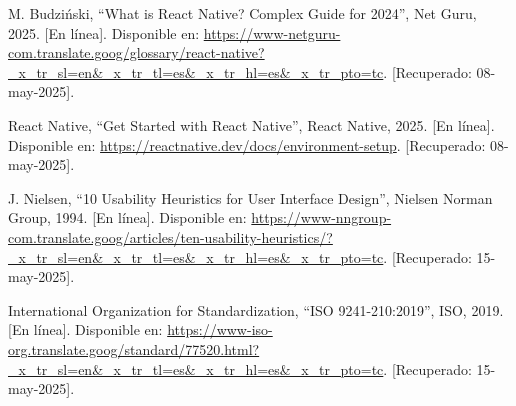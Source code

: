 \begin{thebibliography}{200}
    M. Budziński, “What is React Native? Complex Guide for 2024”, Net Guru, 2025. [En línea]. Disponible en: \url{https://www-netguru-com.translate.goog/glossary/react-native?_x_tr_sl=en&_x_tr_tl=es&_x_tr_hl=es&_x_tr_pto=tc}. [Recuperado: 08-may-2025].

    React Native, “Get Started with React Native”, React Native, 2025. [En línea]. Disponible en: \url{https://reactnative.dev/docs/environment-setup}. [Recuperado: 08-may-2025].

    J. Nielsen, “10 Usability Heuristics for User Interface Design”, Nielsen Norman Group, 1994. [En línea]. Disponible en: \url{https://www-nngroup-com.translate.goog/articles/ten-usability-heuristics/?_x_tr_sl=en&_x_tr_tl=es&_x_tr_hl=es&_x_tr_pto=tc}. [Recuperado: 15-may-2025].

    International Organization for Standardization, “ISO 9241-210:2019”, ISO, 2019. [En línea]. Disponible en: \url{https://www-iso-org.translate.goog/standard/77520.html?_x_tr_sl=en&_x_tr_tl=es&_x_tr_hl=es&_x_tr_pto=tc}. [Recuperado: 15-may-2025].
\end{thebibliography}
